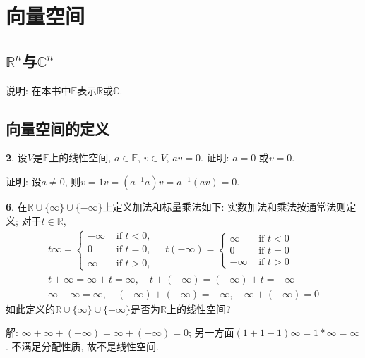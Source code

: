 \section{向量空间}

\subsection{$\mathbb{R}^n$与$\mathbb{C}^n$}

\par 说明: 在本书中$\mathbb{F}$表示$\mathbb{R}$或$\mathbb{C}$.

\subsection{向量空间的定义}

\par \textbf{2}. 设$V$是$\mathbb{F}$上的线性空间, $a\in \mathbb{F}$, $v\in V$, $av=0$. 证明: $a=0$ 或$v=0$.
\par 证明: 设$a\neq 0$, 则$v=1v=(a^{-1}a)v=a^{-1}(av)=0$.

\par \textbf{6}. 在$\mathbb{R}\cup \{\infty \} \cup \{-\infty\}$上定义加法和标量乘法如下: 实数加法和乘法按通常法则定义; 对于$t\in \mathbb{R}$,
\begin{equation*}
\begin{array}{c}
t \infty=\left\{\begin{array}{ll}
-\infty & \text { if } t<0, \\
0 & \text { if } t=0, \\
\infty & \text { if } t>0,
\end{array} \quad t(-\infty)=\left\{\begin{array}{ll}
\infty & \text { if } t<0 \\
0 & \text { if } t=0 \\
-\infty & \text { if } t>0
\end{array}\right.\right. \\
t+\infty=\infty+t=\infty, \quad t+(-\infty)=(-\infty)+t=-\infty \\
\infty+\infty=\infty, \quad(-\infty)+(-\infty)=-\infty, \quad \infty+(-\infty)=0
\end{array}
\end{equation*}
如此定义的$\mathbb{R}\cup \{\infty \} \cup \{-\infty\}$是否为$\mathbb{R}$上的线性空间?

\par 解: $\infty+\infty+(-\infty)=\infty+(-\infty)=0$; 另一方面$(1+1-1)\infty=1*\infty=\infty$. 不满足分配性质, 故不是线性空间.

